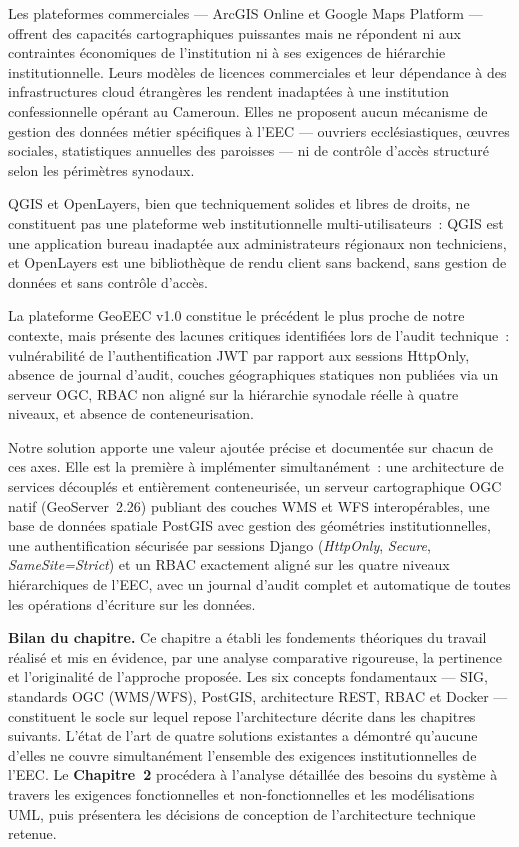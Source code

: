 \documentclass[12pt, a4paper]{report}
\begin{document}
Les plateformes commerciales --- ArcGIS Online et Google Maps Platform --- offrent
des capacités cartographiques puissantes mais ne répondent ni aux contraintes
économiques de l'institution ni à ses exigences de hiérarchie institutionnelle.
Leurs modèles de licences commerciales et leur dépendance à des infrastructures
cloud étrangères les rendent inadaptées à une institution confessionnelle opérant
au Cameroun. Elles ne proposent aucun mécanisme de gestion des données métier
spécifiques à l'EEC --- ouvriers ecclésiastiques, œuvres sociales, statistiques
annuelles des paroisses --- ni de contrôle d'accès structuré selon les périmètres
synodaux.

QGIS et OpenLayers, bien que techniquement solides et libres de droits, ne
constituent pas une plateforme web institutionnelle multi-utilisateurs~: QGIS est
une application bureau inadaptée aux administrateurs régionaux non techniciens, et
OpenLayers est une bibliothèque de rendu client sans backend, sans gestion de
données et sans contrôle d'accès.

La plateforme GeoEEC v1.0 constitue le précédent le plus proche de notre contexte,
mais présente des lacunes critiques identifiées lors de l'audit technique~:
vulnérabilité de l'authentification JWT par rapport aux sessions HttpOnly, absence
de journal d'audit, couches géographiques statiques non publiées via un serveur
OGC, RBAC non aligné sur la hiérarchie synodale réelle à quatre niveaux, et absence
de conteneurisation.

Notre solution apporte une valeur ajoutée précise et documentée sur chacun de ces
axes. Elle est la première à implémenter simultanément~: une architecture de services
découplés et entièrement conteneurisée, un serveur cartographique OGC natif
(GeoServer~2.26) publiant des couches WMS et WFS interopérables, une base de données
spatiale PostGIS avec gestion des géométries institutionnelles, une authentification
sécurisée par sessions Django (\textit{HttpOnly}, \textit{Secure},
\textit{SameSite=Strict}) et un RBAC exactement aligné sur les quatre niveaux
hiérarchiques de l'EEC, avec un journal d'audit complet et automatique de toutes
les opérations d'écriture sur les données.

\medskip
\noindent\textbf{Bilan du chapitre.}
Ce chapitre a établi les fondements théoriques du travail réalisé et mis en
évidence, par une analyse comparative rigoureuse, la pertinence et l'originalité
de l'approche proposée. Les six concepts fondamentaux --- SIG, standards OGC
(WMS/WFS), PostGIS, architecture REST, RBAC et Docker --- constituent le socle sur
lequel repose l'architecture décrite dans les chapitres suivants. L'état de l'art
de quatre solutions existantes a démontré qu'aucune d'elles ne couvre simultanément
l'ensemble des exigences institutionnelles de l'EEC. Le \textbf{Chapitre~2} procédera
à l'analyse détaillée des besoins du système à travers les exigences fonctionnelles
et non-fonctionnelles et les modélisations UML, puis présentera les décisions de
conception de l'architecture technique retenue.
\end{document}
